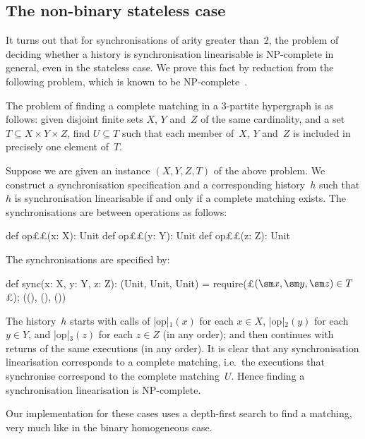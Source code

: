 \subsection{The non-binary stateless case}
\label{sec:non-binary-stateless}

It turns out that for synchronisations of arity greater than~2, the problem of
deciding whether a history is synchronisation linearisable is NP-complete in
general, even in the stateless case.  We prove this fact by reduction from the
following problem, which is known to be NP-complete~\cite{Karp1972}.
%
\begin{definition}
The problem of finding a complete matching in a 3-partite hypergraph is as
follows: given disjoint finite sets $X$, $Y$ and~$Z$ of the same cardinality,
and a set $T \subseteq X \times Y \times Z$, find $U \subseteq T$ such that
each member of~$X$, $Y$ and~$Z$ is included in precisely one element of~$T$.
\end{definition}

Suppose we are given an instance $(X, Y, Z, T)$ of the above problem.  We
construct a synchronisation specification and a corresponding history~$h$ such
that $h$ is synchronisation linearisable if and only if a complete matching
exists.  The synchronisations are between operations as follows:
\begin{scala}
  def op££(x: X): Unit
  def op££(y: Y): Unit
  def op££(z: Z): Unit
\end{scala}
%
The synchronisations are specified by:
%
\begin{scala}
  def sync(x: X, y: Y, z: Z): (Unit, Unit, Unit) = {
    require(£$(\sm x, \sm y, \sm z) \in T$£); ((), (), ())
  }
\end{scala}
%
The history~$h$ starts with calls of |op|$_1(x)$ for each $x \in X$,
|op|$_2(y)$ for each $y \in Y$, and |op|$_3(z)$ for each $z \in Z$ (in any
order); and then continues with returns of the same executions (in any
order).  It is clear that any synchronisation linearisation corresponds to a
complete matching, i.e.~the executions that synchronise correspond to the
complete matching~$U$.  Hence finding a synchronisation linearisation is
NP-complete. 

Our implementation for these cases uses a depth-first search to find a
matching, very much like in the binary homogeneous case.

